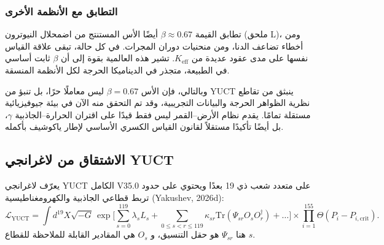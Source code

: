 \documentclass[11pt,a4paper]{article}
\newcommand{\lagr}{\mathcal{L}}
\begin{document}
	\subsubsection{التطابق مع الأنظمة الأخرى}
	تطابق القيمة $\beta \approx 0.67$ أيضًا الأس المستنتج من اضمحلال النيوترون (ملحق L)، ومن أخطاء تضاعف الدنا، ومن منحنيات دوران المجرات. في كل حالة، تبقى علاقة القياس نفسها على مدى عقود عديدة من $K_{\mathrm{eff}}$. تشير هذه العالمية بقوة إلى أن $\beta$ ثابت أساسي في الطبيعة، متجذر في الديناميكا الحرجة لكل الأنظمة المنسقة.
	
	وبالتالي، فإن الأس $\beta = 0.67$ ليس معاملًا حرًا، بل تنبؤ من YUCT ينبثق من تقاطع نظرية الظواهر الحرجة والبيانات التجريبية، وقد تم التحقق منه الآن في بيئة جيوفيزيائية مستقلة تمامًا. يقدم نظام الأرض–القمر ليس فقط قيدًا على اقتران الحرارة–الجاذبية $\gamma$، بل أيضًا تأكيدًا مستقلاً لقانون القياس الكسري الأساسي لإطار ياكوشيف بأكمله.
	
	\subsection{الاشتقاق من لاغرانجي YUCT}
	\label{subsec:lagrangian-derivation}
	
	يعرّف لاغرانجي YUCT الكامل V35.0 على متعدد شعب ذي 19 بعدًا ويحتوي على حدود تربط قطاعي الجاذبية والكهرومغناطيسية (Yakushev, 2026d):
	\begin{equation}
		\lagr_{\text{YUCT}} = \int d^{19}X \sqrt{-G} \, 
		\exp\Bigg[ \sum_{s=0}^{119} \lambda_s L_s + \sum_{0\le s<r\le119} \kappa_{sr} \mathrm{Tr}(\Psi_{sr} O_s O_r^\dagger) + \dots \Bigg]
		\times \prod_{i=1}^{155} \Theta(P_i - P_{i,\text{crit}}).
		\label{eq:lagrangian-full}
	\end{equation}
	هنا $\Psi_{sr}$ هو حقل التنسيق، و $O_s$ هي المقادير القابلة للملاحظة للقطاع $s$.
	
\end{document}
